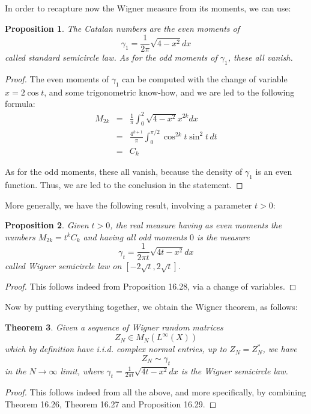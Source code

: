 \documentclass[12pt]{amsbook}
\newtheorem{theorem}{Theorem}[chapter]
\newtheorem{proposition}[theorem]{Proposition}
\begin{document}
In order to recapture now the Wigner measure from its moments, we can use:

\begin{proposition}
The Catalan numbers are the even moments of 
$$\gamma_1=\frac{1}{2\pi}\sqrt{4-x^2}dx$$
called standard semicircle law. As for the odd moments of $\gamma_1$, these all vanish. 
\end{proposition}

\begin{proof}
The even moments of $\gamma_1$ can be computed with the change of variable $x=2\cos t$, and some trigonometric know-how, and we are led to the following formula:
\begin{eqnarray*}
M_{2k}
&=&\frac{1}{\pi}\int_0^2\sqrt{4-x^2}x^{2k}dx\\
&=&\frac{4^{k+1}}{\pi}\int_0^{\pi/2}\cos^{2k}t\sin^2t\,dt\\
&=&C_k
\end{eqnarray*}

As for the odd moments, these all vanish, because the density of $\gamma_1$ is an even function. Thus, we are led to the conclusion in the statement.
\end{proof}

More generally, we have the following result, involving a parameter $t>0$:

\begin{proposition}
Given $t>0$, the real measure having as even moments the numbers $M_{2k}=t^kC_k$ and having all odd moments $0$ is the measure
$$\gamma_t=\frac{1}{2\pi t}\sqrt{4t-x^2}dx$$
called Wigner semicircle law on $[-2\sqrt{t},2\sqrt{t}]$.
\end{proposition}

\begin{proof}
This follows indeed from Proposition 16.28, via a change of variables.
\end{proof}

Now by putting everything together, we obtain the Wigner theorem, as follows:

\begin{theorem}
Given a sequence of Wigner random matrices
$$Z_N\in M_N(L^\infty(X))$$
which by definition have i.i.d. complex normal entries, up to $Z_N=Z_N^*$, we have
$$Z_N\sim\gamma_t$$
in the $N\to\infty$ limit, where $\gamma_t=\frac{1}{2\pi t}\sqrt{4t-x^2}dx$ is the Wigner semicircle law. 
\end{theorem}

\begin{proof}
This follows indeed from all the above, and more specifically, by combining Theorem 16.26, Theorem 16.27 and Proposition 16.29.
\end{proof}
\end{document}
